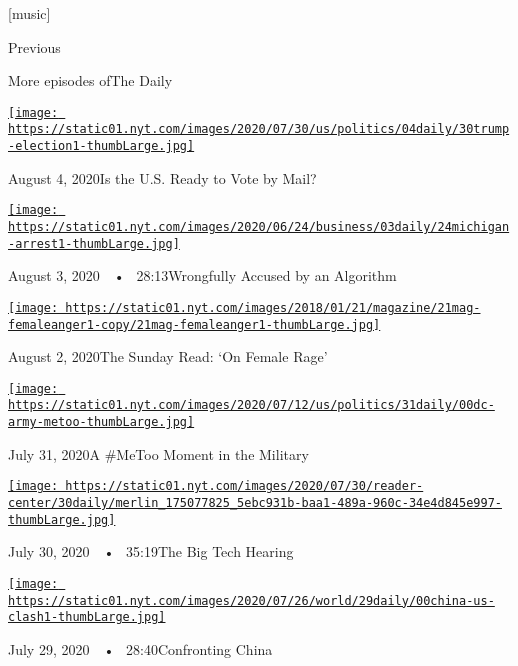 {[}music{]}

Previous

More episodes ofThe Daily

\href{https://www.nytimes.com/2020/08/04/podcasts/the-daily/mail-in-voting-president-trump.html?action=click\&module=audio-series-bar\&region=header\&pgtype=Article}{\texttt{[image: https://static01.nyt.com/images/2020/07/30/us/politics/04daily/30trump-election1-thumbLarge.jpg]}}

August 4, 2020Is the U.S. Ready to Vote by Mail?

\href{https://www.nytimes.com/2020/08/03/podcasts/the-daily/algorithmic-justice-racism.html?action=click\&module=audio-series-bar\&region=header\&pgtype=Article}{\texttt{[image: https://static01.nyt.com/images/2020/06/24/business/03daily/24michigan-arrest1-thumbLarge.jpg]}}

August 3, 2020~~•~ 28:13Wrongfully Accused by an Algorithm

\href{https://www.nytimes.com/2020/08/02/podcasts/the-daily/on-female-rage.html?action=click\&module=audio-series-bar\&region=header\&pgtype=Article}{\texttt{[image: https://static01.nyt.com/images/2018/01/21/magazine/21mag-femaleanger1-copy/21mag-femaleanger1-thumbLarge.jpg]}}

August 2, 2020The Sunday Read: `On Female Rage'

\href{https://www.nytimes.com/2020/07/31/podcasts/the-daily/vanessa-guillen-military-metoo.html?action=click\&module=audio-series-bar\&region=header\&pgtype=Article}{\texttt{[image: https://static01.nyt.com/images/2020/07/12/us/politics/31daily/00dc-army-metoo-thumbLarge.jpg]}}

July 31, 2020A \#MeToo Moment in the Military

\href{https://www.nytimes.com/2020/07/30/podcasts/the-daily/congress-facebook-amazon-google-apple.html?action=click\&module=audio-series-bar\&region=header\&pgtype=Article}{\texttt{[image: https://static01.nyt.com/images/2020/07/30/reader-center/30daily/merlin\_175077825\_5ebc931b-baa1-489a-960c-34e4d845e997-thumbLarge.jpg]}}

July 30, 2020~~•~ 35:19The Big Tech Hearing

\href{https://www.nytimes.com/2020/07/29/podcasts/the-daily/china-trump-foreign-policy.html?action=click\&module=audio-series-bar\&region=header\&pgtype=Article}{\texttt{[image: https://static01.nyt.com/images/2020/07/26/world/29daily/00china-us-clash1-thumbLarge.jpg]}}

July 29, 2020~~•~ 28:40Confronting China

